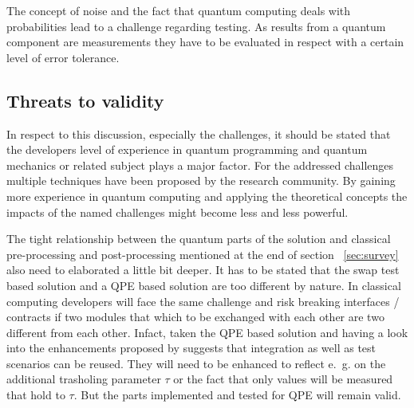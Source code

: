 
The concept of noise and the fact that quantum computing deals with probabilities lead to a challenge regarding testing. As results from a quantum component are measurements they have to be evaluated in respect with a certain level of error tolerance.

\subsection{Threats to validity}
\label{subsec:threats}
In respect to this discussion, especially the challenges, it should be stated that the developers level of experience in quantum programming and quantum mechanics or related subject plays a major factor. For the addressed challenges multiple techniques have been proposed by the research community. By gaining more experience in quantum computing and applying the theoretical concepts the impacts of the named challenges might become less and less powerful.

The tight relationship between the quantum parts of the solution and classical pre-processing and post-processing mentioned at the end of section ~\ref{sec:survey} also need to elaborated a little bit deeper. It has to be stated that the swap test based solution and a QPE based solution are too different by nature. In classical computing developers will face the same challenge and risk breaking interfaces / contracts if two modules that which to be exchanged with each other are two different from each other. Infact, taken the QPE based solution and having a look into the enhancements proposed by \cite{He_2021} suggests that integration as well as test scenarios can be reused. They will need to be enhanced to reflect e.~g. on the additional trasholing parameter $\tau$ or the fact that only values will be measured that hold to $\tau$. But the parts implemented and tested for QPE will remain valid.

